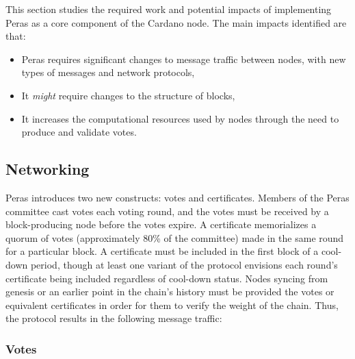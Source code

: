 \documentclass[10pt]{article}
\providecommand{\tightlist}{%
  \setlength{\itemsep}{0pt}\setlength{\parskip}{0pt}}
\begin{document}
This section studies the required work and potential impacts of
implementing Peras as a core component of the Cardano node. The main
impacts identified are that:

\begin{itemize}
\tightlist
\item
  Peras requires significant changes to message traffic between nodes,
  with new types of messages and network protocols,
\item
  It \emph{might} require changes to the structure of blocks,
\item
  It increases the computational resources used by nodes through the
  need to produce and validate votes.
\end{itemize}

\subsection{Networking}\label{networking}

Peras introduces two new constructs: votes and certificates. Members of
the Peras committee cast votes each voting round, and the votes must be
received by a block-producing node before the votes expire. A
certificate memorializes a quorum of votes (approximately 80\% of the
committee) made in the same round for a particular block. A certificate
must be included in the first block of a cool-down period, though at
least one variant of the protocol envisions each round's certificate
being included regardless of cool-down status. Nodes syncing from
genesis or an earlier point in the chain's history must be provided the
votes or equivalent certificates in order for them to verify the weight
of the chain. Thus, the protocol results in the following message
traffic:

\subsubsection{Votes}\label{votes}
\end{document}
